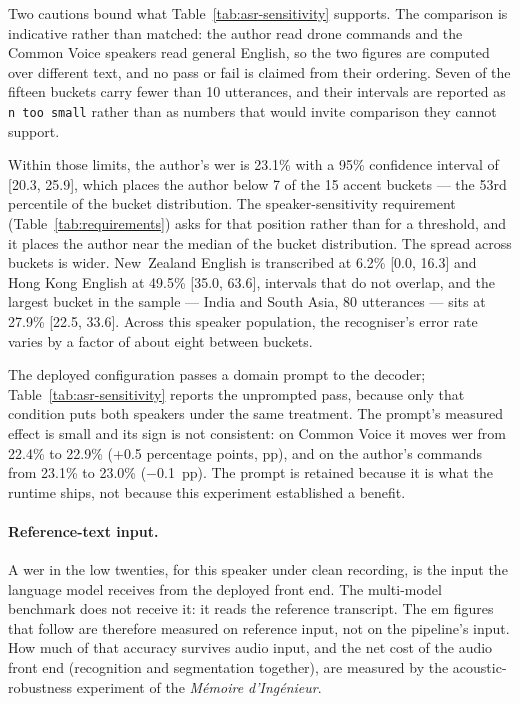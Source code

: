 

Two cautions bound what Table~\ref{tab:asr-sensitivity} supports. The comparison is indicative
rather than matched: the author read drone commands and the Common Voice speakers read general
English, so the two figures are computed over different text, and no pass or fail is claimed from
their ordering. Seven of the fifteen buckets carry fewer than 10 utterances, and their intervals are
reported as \texttt{n too small} rather than as numbers that would invite comparison they cannot
support.

Within those limits, the author's \gls{wer} is 23.1\% with a 95\% confidence interval of [20.3,
25.9], which places the author below 7 of the 15 accent buckets --- the 53rd percentile of the
bucket distribution. The speaker-sensitivity requirement (Table~\ref{tab:requirements}) asks for
that position rather than for a threshold, and it places the author near the median of the bucket
distribution. The spread across buckets is wider. New~Zealand English is transcribed at 6.2\%
[0.0, 16.3] and Hong Kong English at 49.5\% [35.0, 63.6], intervals that do not overlap, and the
largest bucket in the sample --- India and South Asia, 80 utterances --- sits at 27.9\% [22.5,
33.6]. Across this speaker population, the recogniser's error rate varies by a factor of about
eight between buckets.

The deployed configuration passes a domain prompt to the decoder; Table~\ref{tab:asr-sensitivity}
reports the unprompted pass, because only that condition puts both speakers under the same
treatment. The prompt's measured effect is small and its sign is not consistent: on Common Voice it
moves \gls{wer} from 22.4\% to 22.9\% (+0.5 percentage points, pp), and on the author's commands from
23.1\% to 23.0\% ($-$0.1~pp). The prompt is retained because it is what the runtime ships, not
because this experiment established a benefit.

\paragraph{Reference-text input.} A \gls{wer} in the low twenties, for this speaker under clean
recording, is the input the language model receives from the deployed front end. The multi-model
benchmark does not receive it: it reads the reference transcript. The \gls{em} figures that
follow are therefore measured on reference input, not on the pipeline's input. How much of that
accuracy survives audio input, and the net cost of the audio front end (recognition and
segmentation together), are measured by the acoustic-robustness experiment of the
\emph{M\'emoire d'Ing\'enieur}.

